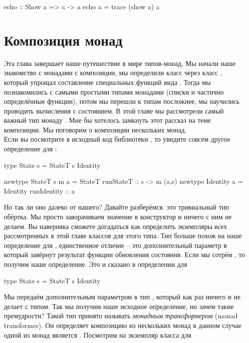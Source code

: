 \begin{code}
echo :: Show a => a -> a
echo a = trace (show a) a
\end{code}

\section{Композиция монад}

Эта глава завершает наше путешествие в мире типов-монад. Мы начали наше
знакомство с монадами с композиции, мы определили класс  через
класс , который упрощал составление специальных функций вида
. Тогда мы познакомились с самыми простыми типами монадами
(списки и частично определённые функции), потом мы перешли к типам
посложнее, мы научились проводить вычисления с состоянием. В этой главе
мы рассмотрели самый важный тип монаду . Мне бы хотелось замкнуть
этот рассказ на теме композиции. Мы поговорим о композиции нескольких
монад.\\Если вы посмотрите в исходный код библиотеки ,
то увидите совсем другое определение для :


\begin{code}
type State s = StateT s Identity

newtype StateT s m a = StateT { runStateT :: s -> m (a,s) }
newtype Identity a = Identity { runIdentity :: a }
\end{code}

Но так ли оно далеко от нашего? Давайте разберёмся.  это
тривиальный тип обёртка. Мы просто заворачиваем значение в конструктор и
ничего с ним не делаем. Вы наверняка сможете догадаться как определить
экземпляры всех рассмотренных в этой главе классов для этого типа. Тип
 больше похож на наше определение для ,
единственное отличие -- это дополнительный параметр  в который
завёрнут результат функции обновления состояния. Если мы сотрём ,
то получим наше определение. Это и сказано в определении для 


\begin{code}
type State s = StateT s Identity
\end{code}

Мы передаём дополнительным параметром в  тип ,
который как раз ничего и не делает с типом. Так мы получим наше исходное
определение, но зачем такие премудрости? Такой тип принято называть
\emph{монадным трансформером} (monad transformer). Он определяет
композицию из нескольких монад в данном случае одной из монад является
. Посмотрим на экземпляр класса  для 


